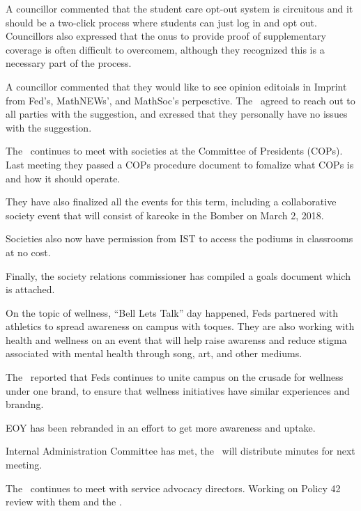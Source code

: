 \begin{information}
    A councillor commented that the student care opt-out system is circuitous
    and it should be a two-click process where students can just log in and 
    opt out. Councillors also expressed that the onus to provide proof of 
    supplementary coverage is often difficult to overcomem, although they
    recognized this is a necessary part of the process. 

    A councillor commented that they would like to see opinion editoials in
    Imprint from Fed's, MathNEWs', and MathSoc's perpesctive. The \vpof\ agreed
    to reach out to all parties with the suggestion, and exressed that they 
    personally have no issues with the suggestion.

\end{information}

\begin{information}

    The \vpi\ continues to meet with societies at the Committee of Presidents
    (COPs). Last meeting they passed a COPs procedure document to fomalize
    what COPs is and how it should operate. 

    They have also finalized all the events for this term, including a
    collaborative society event that will consist of kareoke in the Bomber on
    March 2, 2018.

    Societies also now have permission from IST to access the podiums in
    classrooms at no cost. 
    
    Finally, the society relations commissioner has compiled a goals document
    which is attached. 

    On the topic of wellness, ``Bell Lets Talk'' day happened, Feds partnered
    with athletics to spread awareness on campus with toques.  They are also
    working with health and wellness on an event that will help raise
    awarenss and reduce stigma associated with mental health through song, art,
    and other mediums. 

    The \vpi\ reported that Feds continues to unite campus on the crusade for
    wellness under one brand, to ensure that wellness initiatives have similar
    experiences and brandng.

    EOY has been rebranded in an effort to get more awareness and uptake. 

    Internal Administration Committee has met, the \vpi\ will distribute
    minutes for next meeting.

    The \vpi\ continues to meet with service advocacy directors. Working on
    Policy 42 review with them and the \pres.


\end{information}

